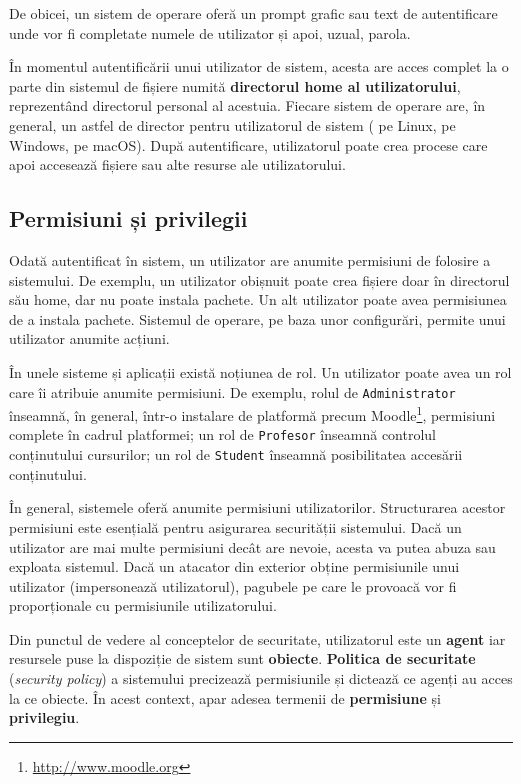 De obicei, un sistem de operare oferă un prompt grafic sau text de autentificare
unde vor fi completate numele de utilizator și apoi, uzual, parola.

În momentul autentificării unui utilizator de sistem, acesta are acces complet
la o parte din sistemul de fișiere numită \textbf{directorul home al utilizatorului},
reprezentând directorul personal al acestuia. Fiecare sistem de operare are, în
general, un astfel de director pentru utilizatorul de sistem ( pe
Linux,  pe Windows,
 pe macOS). După autentificare, utilizatorul poate crea procese care apoi
accesează fișiere sau alte resurse ale utilizatorului.

\subsection{Permisiuni și privilegii}
\label{sec:user:permissions}

Odată autentificat în sistem, un utilizator are anumite
permisiuni de folosire a sistemului. De exemplu, un utilizator obișnuit poate
crea fișiere doar în directorul său home, dar nu poate instala pachete. Un
alt utilizator poate avea permisiunea de a instala pachete. Sistemul de operare,
pe baza unor configurări, permite unui utilizator anumite acțiuni.

În unele sisteme și aplicații există noțiunea de rol. Un utilizator poate avea
un rol care îi atribuie anumite permisiuni. De exemplu, rolul de \texttt{Administrator}
înseamnă, în general, într-o instalare de platformă precum Moodle\footnote{\url{http://www.moodle.org}}, permisiuni complete în cadrul platformei; un rol de
\texttt{Profesor} înseamnă controlul conținutului cursurilor; un rol de
\texttt{Student} înseamnă posibilitatea accesării conținutului.

În general, sistemele oferă anumite permisiuni utilizatorilor.
Structurarea acestor permisiuni este esențială pentru asigurarea securității
sistemului. Dacă un utilizator are mai multe permisiuni decât are nevoie, acesta
va putea abuza sau exploata sistemul. Dacă un atacator din exterior obține
permisiunile unui utilizator (impersonează utilizatorul), pagubele pe care le
provoacă vor fi proporționale cu permisiunile utilizatorului.

Din punctul de vedere al conceptelor de securitate, utilizatorul este un \textbf{agent}
iar resursele puse la dispoziție de sistem sunt \textbf{obiecte}. \textbf{Politica de securitate}
(\textit{security policy}) a sistemului precizează permisiunile și dictează ce
agenți au acces la ce obiecte. În acest context, apar adesea termenii de
\textbf{permisiune} și \textbf{privilegiu}.

